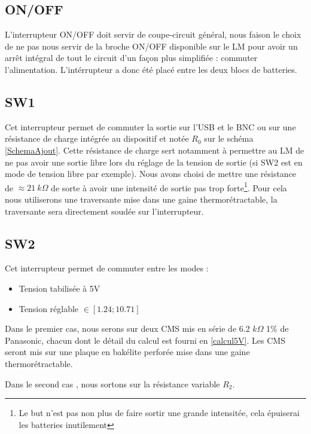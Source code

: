 \documentclass[12pt]{article}
\begin{document}
\subsection{ON/OFF}

L'interrupteur ON/OFF doit servir de coupe-circuit général, nous faison le choix de ne pas nous servir de la broche
ON/OFF disponible sur le LM pour avoir un arrêt intégral de tout le circuit d'un façon plus simplifiée : commuter
l'alimentation. L'intérrupteur a donc été placé entre les deux blocs de batteries.

\subsection{SW1}

Cet interrupteur permet de commuter la sortie sur l'USB et le BNC ou sur une résistance de charge intégrée au dispositif
et notée $R_0$ sur le schéma \ref{SchemaAjout}. Cette résistance de charge sert notamment à permettre au LM de ne pas avoir
une sortie libre lors du réglage de la tension de sortie (si SW2 est en mode de tension libre par exemple). Nous avons 
choisi de mettre une résistance de $\approx 21\ k\Omega$ de sorte à avoir une intensité de sortie pas trop forte\footnote{
Le but n'est pas non plus de faire sortir une grande intensitée, cela épuiserai les batteries inutilement}. Pour
cela nous utiliserons une traversante mise dans une gaine thermorétractable, la traversante sera directement soudée 
sur l'interrupteur.

\subsection{SW2}

Cet interrupteur permet de commuter entre les modes :

\begin{itemize}
	\item Tension tabilisée à 5V
	\item Tension réglable $\in [1.24 ; 10.71]$\\
\end{itemize}

Dans le premier cas, nous serons sur deux CMS mis en série de 6.2 $k\Omega$ 1\% de Panasonic, chacun dont 
le détail du calcul est fourni en \ref{calcul5V}. Les CMS seront mis sur une plaque en bakélite perforée mise dans
une gaine thermorétractable.\newline

Dans le second cas , nous sortons sur la résistance variable $R_2$.
\end{document}
